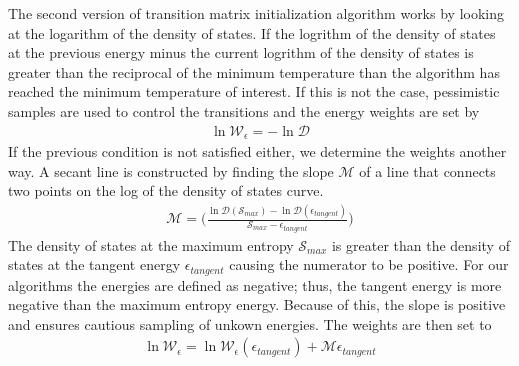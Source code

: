 \documentclass[letterpaper,twocolumn,amsmath,amssymb,pre,aps,10pt]{revtex4-1}
\begin{document}
The second version of transition matrix initialization algorithm works by looking at
the logarithm of the density of states.  If the logrithm of the density of states at 
the previous energy minus the current logrithm of the density of states is greater than
the reciprocal of the minimum temperature than the algorithm has reached the minimum 
temperature of interest.  If this is not the case, pessimistic samples are used to control
the transitions and the energy weights are set by
\begin{align}
  \ln\mathcal{W}_\epsilon = - \ln\mathcal{D}
\end{align} 
If the previous condition is not satisfied either, we determine the weights another way.
A secant line is constructed by finding the slope $\mathcal{M}$ of a line that 
connects two points on the log of the density of states curve.
\begin{align}
  \mathcal{M} = \bigg(\frac{\ln\mathcal{D}(\mathcal{S}_{max}) - \ln\mathcal{D}
  (\epsilon_{tangent})}{\mathcal{S}_{max}-\epsilon_{tangent}}\bigg)
\end{align} 
The density of states at the maximum entropy $\mathcal{S}_{max}$ is greater than
the density of states at the tangent energy $\epsilon_{tangent}$ causing the numerator
to be positive.  For our algorithms the energies are defined as negative; thus, the 
tangent energy is more negative than the maximum entropy energy.  Because of this, the
slope is positive and ensures cautious sampling of unkown energies.  The weights are 
then set to 
\begin{align}
  \ln\mathcal{W}_\epsilon = \ln\mathcal{W}_\epsilon (\epsilon_{tangent}) +
  \mathcal{M}\epsilon_{tangent}
\end{align}



\end{document}
